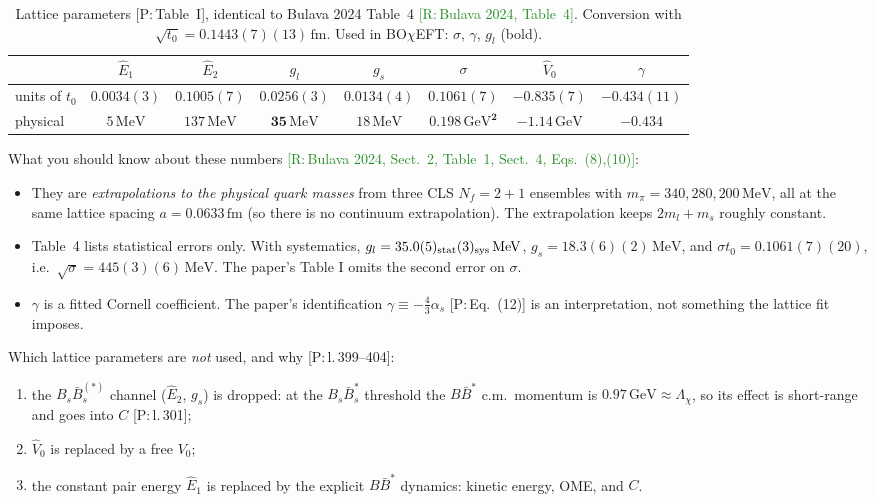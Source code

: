 \documentclass[11pt,a4paper]{article}
\newcommand{\tagP}[1]{\textcolor{blue!65!black}{\textsf{\small[P:\,#1]}}}
\newcommand{\tagR}[1]{\textcolor{ForestGreen}{\textsf{\small[R:\,#1]}}}
\newcommand{\BBst}{B\bar B^*}
\newcommand{\BOchiEFT}{BO$\chi$EFT}
\newcommand{\GeV}{\,\mathrm{GeV}}
\newcommand{\MeV}{\,\mathrm{MeV}}
\newcommand{\fm}{\,\mathrm{fm}}
\begin{document}
\begin{table}[h]
\centering
\caption{Lattice parameters \tagP{Table~I}, identical to Bulava 2024 Table~4 \tagR{Bulava 2024, Table~4}. Conversion with $\sqrt{t_0}=0.1443(7)(13)\fm$. Used in \BOchiEFT: $\sigma$, $\gamma$, $g_l$ (bold).}
\label{tab:lattice}
\setlength{\tabcolsep}{4pt}\small
\begin{tabular}{lccccccc}
\toprule
& $\hat E_1$ & $\hat E_2$ & $g_l$ & $g_s$ & $\sigma$ & $\hat V_0$ & $\gamma$\\
\midrule
units of $t_0$ & $0.0034(3)$ & $0.1005(7)$ & $0.0256(3)$ & $0.0134(4)$ & $0.1061(7)$ & $-0.835(7)$ & $-0.434(11)$\\
physical & $5\MeV$ & $137\MeV$ & $\bm{35\MeV}$ & $18\MeV$ & $\bm{0.198\GeV^2}$ & $-1.14\GeV$ & $\bm{-0.434}$\\
\bottomrule
\end{tabular}
\end{table}

What you should know about these numbers \tagR{Bulava 2024, Sect.~2, Table~1, Sect.~4, Eqs.~(8),(10)}:
\begin{itemize}
\item They are \emph{extrapolations to the physical quark masses} from three CLS $N_f=2+1$ ensembles with $m_\pi=340,280,200\MeV$, all at the same lattice spacing $a=0.0633\fm$ (so there is no continuum extrapolation). The extrapolation keeps $2m_l+m_s$ roughly constant.
\item Table~4 lists statistical errors only. With systematics, $g_l=35.0(5)_{\rm stat}(3)_{\rm sys}\MeV$, $g_s=18.3(6)(2)\MeV$, and $\sigma t_0=0.1061(7)(20)$, i.e.\ $\sqrt\sigma=445(3)(6)\MeV$. The paper's Table I omits the second error on $\sigma$.
\item $\gamma$ is a fitted Cornell coefficient. The paper's identification $\gamma\equiv-\frac43\alpha_s$ \tagP{Eq.~(12)} is an interpretation, not something the lattice fit imposes.
\end{itemize}
Which lattice parameters are \emph{not} used, and why \tagP{l.\,399--404}:
\begin{enumerate}[label=(\roman*)]
\item the $B_s\bar B_s^{(*)}$ channel ($\hat E_2$, $g_s$) is dropped: at the $B_s\bar B_s^*$ threshold the $\BBst$ c.m.\ momentum is $0.97\GeV\approx\Lambda_\chi$, so its effect is short-range and goes into $C$ \tagP{l.\,301};
\item $\hat V_0$ is replaced by a free $V_0$;
\item the constant pair energy $\hat E_1$ is replaced by the explicit $\BBst$ dynamics: kinetic energy, OME, and $C$.
\end{enumerate}
\end{document}
